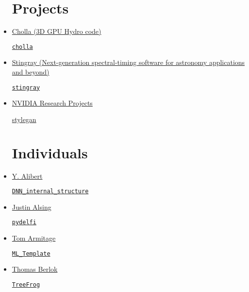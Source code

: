 \documentclass[11pt,a4paper]{article}
\begin{document}
\begin{itemize}
\section*{Projects}  
\item \href{https://github.com/cholla-hydro}{Cholla (3D GPU Hydro code)}
  \begin{itemize}
    \href{https://github.com/cholla-hydro/cholla}{{\tt cholla}}
  \end{itemize}

\item \href{https://github.com/StingraySoftware}{Stingray (Next-generation spectral-timing software for astronomy applications and beyond)}
  \begin{itemize}
    \href{https://github.com/StingraySoftware/stingray}{{\tt stingray}}
  \end{itemize}

\item \href{https://github.com/NVlabs}{NVIDIA Research Projects}
\begin{itemize}
\href{https://github.com/NVlabs/stylegan}{stylegan}
\end{itemize}

 

  
\section*{Individuals}  
 
\item \href{https://github.com/yalibert}{Y. Alibert}
  \begin{itemize}
\href{https://github.com/yalibert/DNN_internal_structure}{{\tt DNN\_internal\_structure}}
\end{itemize}

\item \href{https://github.com/justinalsing}{Justin Alsing}
  \begin{itemize}
\href{https://github.com/justinalsing/pydelfi}{{\tt pydelfi}}
\end{itemize}


\item \href{https://github.com/TomArmitage}{Tom Armitage}
  \begin{itemize}
    \href{https://github.com/TomArmitage/ML\_Template}{{\tt ML\_Template}}
  \end{itemize}

\item \href{https://github.com/tberlok}{Thomas Berlok} 
  \begin{itemize}
   \href{https://github.com/pelahi/TreeFrog}{\tt TreeFrog}
  \end{itemize}


\end{itemize}
\end{document}
